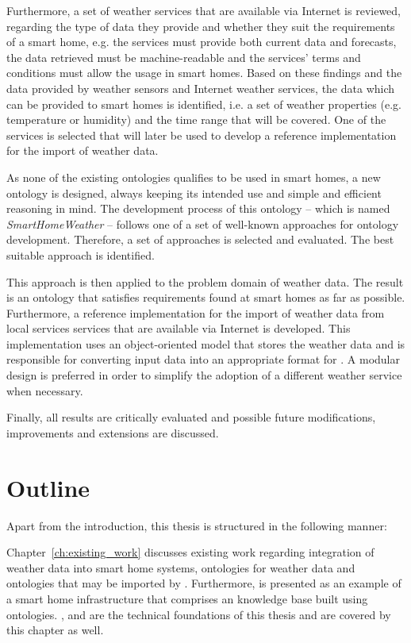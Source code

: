 Furthermore, a set of weather services that are available via Internet is reviewed, regarding the type of data they provide and whether they suit the requirements of a smart home, e.g. the services must provide both current data and forecasts, the data retrieved must be machine-readable and the services' terms and conditions must allow the usage in smart homes. Based on these findings and the data provided by weather sensors and Internet weather services, the data which can be provided to smart homes is identified, i.e. a set of weather properties (e.g. temperature or humidity) and the time range that will be covered. One of the services is selected that will later be used to develop a reference implementation for the import of weather data.

As none of the existing ontologies qualifies to be used in smart homes, a new  ontology is designed, always keeping its intended use and simple and efficient reasoning in mind. The development process of this ontology -- which is named \emph{SmartHomeWeather} -- follows one of a set of well-known approaches for ontology development. Therefore, a set of approaches is selected and evaluated. The best suitable approach is identified.

This approach is then applied to the problem domain of weather data. The result is an ontology that satisfies requirements found at smart homes as far as possible. Furthermore, a reference implementation for the import of weather data from local services services that are available via Internet is developed. This implementation uses an object-oriented model that stores the weather data and is responsible for converting input data into an appropriate format for \smarthomeweather. A modular design is preferred in order to simplify the adoption of a different weather service when necessary.

Finally, all results are critically evaluated and possible future modifications, improvements and extensions are discussed.

\section{Outline}

Apart from the introduction, this thesis is structured in the following manner:

Chapter~\ref{ch:existing_work} discusses existing work regarding integration of weather data into smart home systems, ontologies for weather data and ontologies that may be imported by \smarthomeweather. Furthermore, \thinkhome is presented as an example of a smart home infrastructure that comprises an knowledge base built using ontologies. ,  and  are the technical foundations of this thesis and are covered by this chapter as well.

